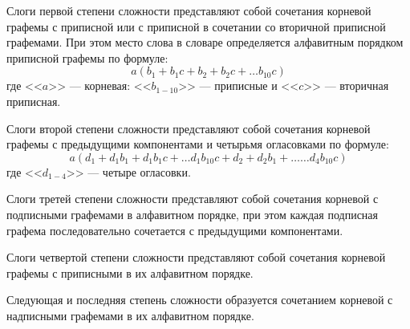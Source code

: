 Слоги первой степени сложности представляют собой сочетания корневой графемы с приписной или с приписной в сочетании со вторичной приписной графемами. При этом место слова в словаре определяется алфавитным порядком приписной графемы по формуле:
\begin{equation*}
a(b_{1} + b_{1}c + b_{2} + b_{2}c + \dots{}b_{10}c)
\end{equation*}
где <<$a$>> --- корневая: <<$b_{1-10}$>> --- приписные и <<$c$>> — вторичная приписная.

Слоги второй степени сложности представляют собой сочетания корневой графемы с предыдущими компонентами и четырьмя огласовками по формуле:
\begin{equation*}
	a(d_{1} + d_{1}b_{1} + d_{1}b_{1}c + \dots{}d_{1}b_{10}c + d_{2} + d_{2}b_{1} + \dots{}\dots{}d_{4}b_{10}c)
\end{equation*}
где <<$d_{1-4}$>> --- четыре огласовки.

Слоги третей степени сложности представляют собой сочетания корневой с подписными графемами в алфавитном порядке, при этом каждая подписная графема последовательно сочетается с предыдущими компонентами.

Слоги четвертой степени сложности представляют собой сочетания корневой графемы с приписными в их алфавитном порядке.

Следующая и последняя степень сложности образуется сочетанием корневой с надписными графемами в их алфавитном порядке.
